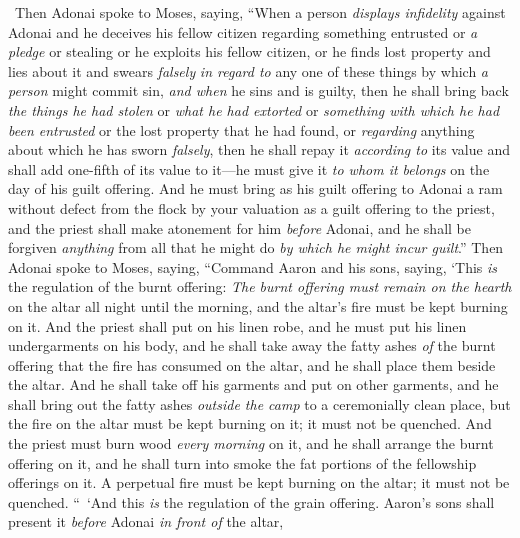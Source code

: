 \begin{biblechapter} %
  Then Adonai spoke to Moses, saying,
\verse “When a person \textit{displays infidelity} against Adonai and he deceives his fellow citizen regarding something entrusted or \textit{a pledge} or stealing or he exploits his fellow citizen,
\verse or he finds lost property and lies about it and swears \textit{falsely} \textit{in regard to} any one of these things by which \textit{a person} might commit sin,
\verse \textit{and when} he sins and is guilty, then he shall bring back \textit{the things he had stolen} or \textit{what he had extorted} or \textit{something with which he had been entrusted} or the lost property that he had found,
\verse or \textit{regarding} anything about which he has sworn \textit{falsely}, then he shall repay it \textit{according to} its value and shall add one-fifth of its value to it—he must give it \textit{to whom it belongs} on the day of his guilt offering.
\verse And he must bring as his guilt offering to Adonai a ram without defect from the flock by your valuation as a guilt offering to the priest,
\verse and the priest shall make atonement for him \textit{before} Adonai, and he shall be forgiven \textit{anything} from all that he might do \textit{by which he might incur guilt}.”
\verse Then Adonai spoke to Moses, saying,
\verse “Command Aaron and his sons, saying, ‘This \textit{is} the regulation of the burnt offering: \textit{The burnt offering must remain on the hearth} on the altar all night until the morning, and the altar’s fire must be kept burning on it.
\verse And the priest shall put on his linen robe, and he must put his linen undergarments on his body, and he shall take away the fatty ashes \textit{of} the burnt offering that the fire has consumed on the altar, and he shall place them beside the altar.
\verse And he shall take off his garments and put on other garments, and he shall bring out the fatty ashes \textit{outside the camp} to a ceremonially clean place,
\verse but the fire on the altar must be kept burning on it; it must not be quenched. And the priest must burn wood \textit{every morning} on it, and he shall arrange the burnt offering on it, and he shall turn into smoke the fat portions of the fellowship offerings on it.
\verse A perpetual fire must be kept burning on the altar; it must not be quenched.
 “ ‘And this \textit{is} the regulation of the grain offering. Aaron’s sons shall present it \textit{before} Adonai \textit{in front of} the altar,

\end{biblechapter}
